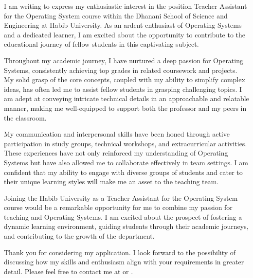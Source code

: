 I am writing to express my enthusiastic interest in the position Teacher Assistant for the Operating System course within the Dhanani School of Science and Engineering at Habib University. As an ardent enthusiast of Operating Systems and a dedicated learner, I am excited about the opportunity to contribute to the educational journey of fellow students in this captivating subject.

\vspace*{0.2cm}

Throughout my academic journey, I have nurtured a deep passion for Operating Systems, consistently achieving top grades in related coursework and projects. My solid grasp of the core concepts, coupled with my ability to simplify complex ideas, has often led me to assist fellow students in grasping challenging topics. I am adept at conveying intricate technical details in an approachable and relatable manner, making me well-equipped to support both the professor and my peers in the classroom.

\vspace*{0.2cm}

My communication and interpersonal skills have been honed through active participation in study groups, technical workshops, and extracurricular activities. These experiences have not only reinforced my understanding of Operating Systems but have also allowed me to collaborate effectively in team settings. I am confident that my ability to engage with diverse groups of students and cater to their unique learning styles will make me an asset to the teaching team.

\vspace*{0.2cm}

Joining the Habib University as a Teacher Assistant for the Operating System course would be a remarkable opportunity for me to combine my passion for teaching and Operating Systems. I am excited about the prospect of fostering a dynamic learning environment, guiding students through their academic journeys, and contributing to the growth of the department.

\vspace*{0.2cm}

Thank you for considering my application. I look forward to the possibility of discussing how my skills and enthusiasm align with your requirements in greater detail. Please feel free to contact me at {\myphone} or {\myemail}.